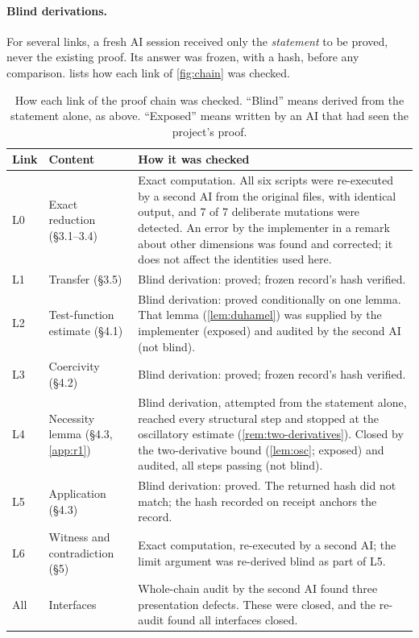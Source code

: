 \documentclass[11pt]{article}
\theoremstyle{plain}
\theoremstyle{definition}
\theoremstyle{remark}
\begin{document}
\paragraph{Blind derivations.}
For several links, a fresh AI session received only the \emph{statement} to be proved, never the existing proof. Its answer was frozen, with a hash, before any comparison.  lists how each link of \cref{fig:chain} was checked.

\begin{table}[ht]
\centering
\caption{How each link of the proof chain was checked. ``Blind'' means derived from the statement alone, as above. ``Exposed'' means written by an AI that had seen the project's proof.}
\label{tab:checking}
\small
\renewcommand{\arraystretch}{1.2}
\begin{tabular}{@{}l P{3.6cm} P{8.6cm}@{}}
\toprule
Link & Content & How it was checked \\
\midrule
L0 & Exact reduction (\S3.1--3.4) & Exact computation. All six scripts were re-executed by a second AI from the original files, with identical output, and 7 of 7 deliberate mutations were detected. An error by the implementer in a remark about other dimensions was found and corrected; it does not affect the identities used here. \\
L1 & Transfer (\S3.5) & Blind derivation: proved; frozen record's hash verified. \\
L2 & Test-function estimate (\S4.1) & Blind derivation: proved conditionally on one lemma. That lemma (\cref{lem:duhamel}) was supplied by the implementer (exposed) and audited by the second AI (not blind). \\
L3 & Coercivity (\S4.2) & Blind derivation: proved; frozen record's hash verified. \\
L4 & Necessity lemma (\S4.3, \cref{app:r1}) & Blind derivation, attempted from the statement alone, reached every structural step and stopped at the oscillatory estimate (\cref{rem:two-derivatives}). Closed by the two-derivative bound (\cref{lem:osc}; exposed) and audited, all steps passing (not blind). \\
L5 & Application (\S4.3) & Blind derivation: proved. The returned hash did not match; the hash recorded on receipt anchors the record. \\
L6 & Witness and contradiction (\S5) & Exact computation, re-executed by a second AI; the limit argument was re-derived blind as part of L5. \\
All & Interfaces & Whole-chain audit by the second AI found three presentation defects. These were closed, and the re-audit found all interfaces closed. \\
\bottomrule
\end{tabular}
\end{table}
\end{document}
